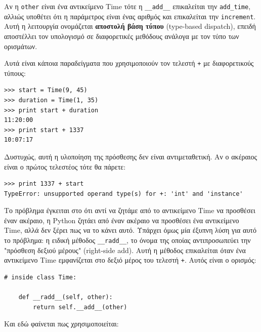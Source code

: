 \documentclass[10pt]{book}
\begin{document}
Αν η {\tt other} είναι ένα αντικείμενο Time τότε η \verb"__add__" επικαλείται την \verb"add_time", αλλιώς υποθέτει
ότι η παράμετρος είναι ένας αριθμός και επικαλείται την {\tt increment}. Αυτή η λειτουργία ονομάζεται {\bf αποστολή
βάση τύπου} (type-based dispatch), επειδή αποστέλλει τον υπολογισμό σε διαφορετικές μεθόδους ανάλογα με τον τύπο
των ορισμάτων.

Αυτά είναι κάποια παραδείγματα που χρησιμοποιούν τον τελεστή {\tt +} με διαφορετικούς τύπους:

\begin{verbatim}
>>> start = Time(9, 45)
>>> duration = Time(1, 35)
>>> print start + duration
11:20:00
>>> print start + 1337
10:07:17
\end{verbatim}
%
Δυστυχώς, αυτή η υλοποίηση της πρόσθεσης δεν είναι αντιμεταθετική. Αν ο ακέραιος είναι ο πρώτος τελεστέος
τότε θα πάρετε:

\begin{verbatim}
>>> print 1337 + start
TypeError: unsupported operand type(s) for +: 'int' and 'instance'
\end{verbatim}
%
Το πρόβλημα έγκειται στο ότι αντί να ζητάμε από το αντικείμενο Time να προσθέσει έναν ακέραιο, η Python ζητάει
από έναν ακέραιο να προσθέσει ένα αντικείμενο Time, αλλά δεν ξέρει πως να το κάνει αυτό. Υπάρχει όμως μία έξυπνη
λύση για αυτό το πρόβλημα: η ειδική μέθοδος \verb"__radd__", το όνομα της οποίας αντιπροσωπεύει την "πρόσθεση
δεξιού μέρους" (right-side add). Αυτή η μέθοδος επικαλείται όταν ένα αντικείμενο Time εμφανίζεται στο δεξιό μέρος
του τελεστή {\tt +}. Αυτός είναι ο ορισμός:

\begin{verbatim}
# inside class Time:

    def __radd__(self, other):
        return self.__add__(other)
\end{verbatim}
%
Και εδώ φαίνεται πως χρησιμοποιείται:
\end{document}
